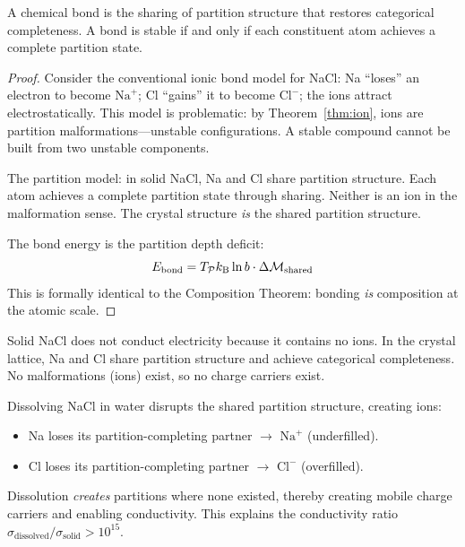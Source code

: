 \begin{theorem}
\label{thm:bond}
A chemical bond is the sharing of partition structure that restores categorical completeness. A bond is stable if and only if each constituent atom achieves a complete partition state.
\end{theorem}

\begin{proof}
Consider the conventional ionic bond model for NaCl: Na ``loses'' an electron to become $\mathrm{Na}^+$; Cl ``gains'' it to become $\mathrm{Cl}^-$; the ions attract electrostatically. This model is problematic: by Theorem~\ref{thm:ion}, ions are partition malformations---unstable configurations. A stable compound cannot be built from two unstable components.

The partition model: in solid NaCl, Na and Cl share partition structure. Each atom achieves a complete partition state through sharing. Neither is an ion in the malformation sense. The crystal structure \emph{is} the shared partition structure.

The bond energy is the partition depth deficit:
\begin{equation}
    E_{\mathrm{bond}} = T_{\mathcal{P}} k_{\mathrm{B}} \ln b \cdot \Delta\mathcal{M}_{\mathrm{shared}}
\end{equation}
This is formally identical to the Composition Theorem: bonding \emph{is} composition at the atomic scale.
\end{proof}

\begin{corollary}
\label{cor:solid_salt}
Solid NaCl does not conduct electricity because it contains no ions. In the crystal lattice, Na and Cl share partition structure and achieve categorical completeness. No malformations (ions) exist, so no charge carriers exist.
\end{corollary}

\begin{corollary}
\label{cor:dissolution}
Dissolving NaCl in water disrupts the shared partition structure, creating ions:
\begin{itemize}
    \item Na loses its partition-completing partner $\rightarrow$ $\mathrm{Na}^+$ (underfilled).
    \item Cl loses its partition-completing partner $\rightarrow$ $\mathrm{Cl}^-$ (overfilled).
\end{itemize}
Dissolution \emph{creates} partitions where none existed, thereby creating mobile charge carriers and enabling conductivity. This explains the conductivity ratio $\sigma_{\mathrm{dissolved}}/\sigma_{\mathrm{solid}} > 10^{15}$.
\end{corollary}

